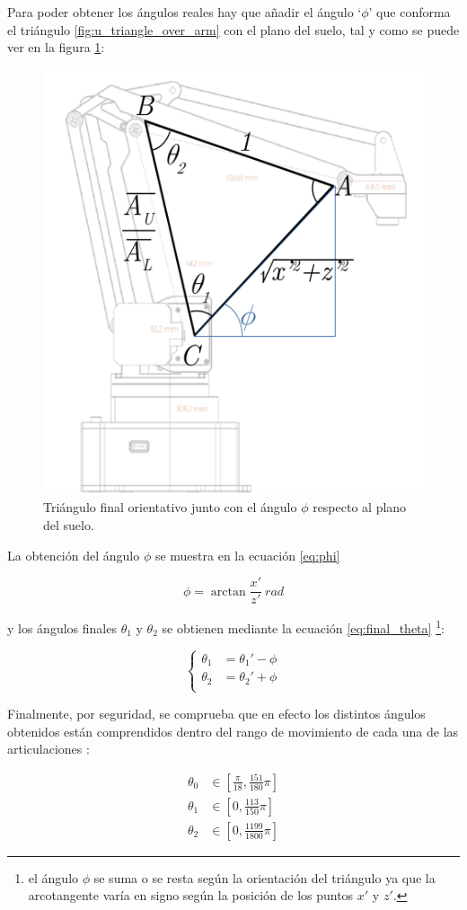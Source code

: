 Para poder obtener los ángulos reales hay que añadir el ángulo `$\phi$' que conforma el triángulo
\ref{fig:u_triangle_over_arm} con el plano del suelo, tal y como se puede ver en la figura
\ref{fig:final_triangle}:

\begin{figure}[H]
    \centering
    \includegraphics[width=.5\linewidth]{pictures/ik_final.png}
    \caption{Triángulo final orientativo junto con el ángulo $\phi$ respecto al plano del suelo.}
    \label{fig:final_triangle}
\end{figure}

La obtención del ángulo $\phi$ se muestra en la ecuación \ref{eq:phi}

\begin{equation}\label{eq:phi}
    \phi = \arctan{\frac{x'}{z'}}~rad
\end{equation}

y los ángulos finales $\theta_1$ y $\theta_2$ se obtienen mediante la ecuación
\ref{eq:final_theta} \footnote{el ángulo $\phi$ se suma o se resta según la orientación
    del triángulo ya que la arcotangente varía en signo según la posición de los puntos
    $x'$ y $z'$.}:

\begin{equation}\label{eq:final_theta}
    \left\{
    \begin{aligned}
        \theta_1 & = \theta_1' - \phi \\
        \theta_2 & = \theta_2' + \phi \\
    \end{aligned}
    \right.
\end{equation}

Finalmente, por seguridad, se comprueba que en efecto los distintos ángulos obtenidos
están comprendidos dentro del rango de movimiento de cada una de las articulaciones
\cite{UArmDeveloperSwiftProForArduino}:

\begin{align*}
    \theta_0 & \in \left[\frac{\pi}{18}, \frac{151}{180}\pi\right] \\
    \theta_1 & \in \left[0, \frac{113}{150}\pi\right]              \\
    \theta_2 & \in \left[0, \frac{1199}{1800}\pi\right]
\end{align*}